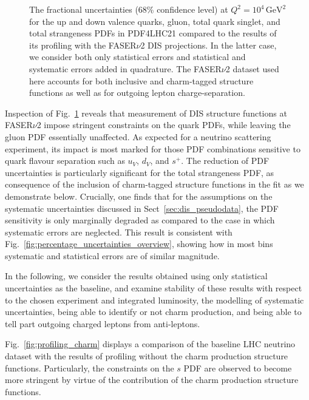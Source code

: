 \begin{figure}[t]
\caption{
The fractional uncertainties   (68\% confidence level) at $Q^2 = 10^4 \, \textrm{GeV}^2$ 
for the up and down valence quarks, gluon, total quark singlet, and total strangeness PDFs
in PDF4LHC21 compared to the results of its profiling with the FASER$\nu$2
DIS projections.
%
In the latter case, we consider both only statistical errors and statistical and systematic
errors added in quadrature.
%
The FASER$\nu$2 dataset used here accounts for both  inclusive and charm-tagged structure functions
as well as for outgoing lepton charge-separation.
%
}
\label{fig:profiling_syst}
\end{figure}

Inspection of Fig.~\ref{fig:profiling_syst} reveals that measurement of DIS structure
functions at FASER$\nu$2 impose stringent constraints on the quark PDFs, while leaving
the gluon PDF essentially unaffected.
%
As expected for a neutrino scattering experiment, its impact is most marked for
those PDF combinations sensitive to quark flavour separation such as $u_V$, $d_V$, and
$s^+$.
%
The reduction of PDF uncertainties is particularly significant for the total strangeness PDF,
as  consequence of the inclusion of charm-tagged structure functions in the fit as we demonstrate below.
%
Crucially, one finds that for the assumptions on the systematic uncertainties
discussed in Sect~\ref{sec:dis_pseudodata}, the PDF sensitivity is only marginally degraded
as compared to the case in which systematic errors are neglected.
%
This result is consistent with Fig.~\ref{fig:percentage_uncertainties_overview}, showing
how in most bins systematic and statistical errors are of similar magnitude.

In the following, we consider the results obtained using only statistical uncertainties as the baseline, 
and examine stability of these results with respect to the chosen experiment and integrated luminosity, the modelling of systematic
uncertainties, being able to identify or not charm production, and being able to tell part outgoing
charged leptons from anti-leptons.


%
Fig.~\ref{fig:profiling_charm} displays a comparison of the baseline LHC neutrino dataset with the results
of profiling without the charm production structure functions. 
Particularly, the constraints on the $s$ PDF are observed to become more stringent 
by virtue of the contribution of the charm production structure functions.

